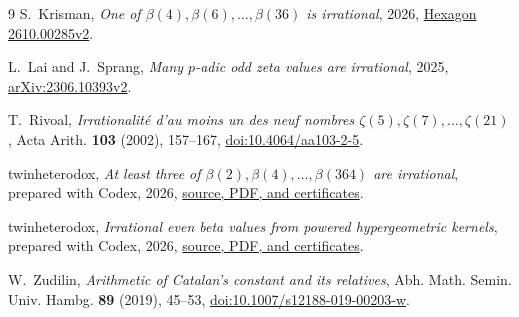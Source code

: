 \clearpage
\begin{thebibliography}{9}
S.~Krisman, \emph{One of $\beta(4),\beta(6),\ldots,\beta(36)$ is
irrational}, 2026, \href{https://hexagonmath.org/abs/2610.00285v2}{Hexagon 2610.00285v2}.

L.~Lai and J.~Sprang, \emph{Many $p$-adic odd zeta values are irrational},
2025, \href{https://arxiv.org/abs/2306.10393v2}{arXiv:2306.10393v2}.

T.~Rivoal, \emph{Irrationalit\'e d'au moins un des neuf nombres
$\zeta(5),\zeta(7),\ldots,\zeta(21)$},
Acta Arith. \textbf{103} (2002), 157--167,
\href{https://doi.org/10.4064/aa103-2-5}{doi:10.4064/aa103-2-5}.

twinheterodox, \emph{At least three of
$\beta(2),\beta(4),\ldots,\beta(364)$ are irrational},
prepared with Codex, 2026,
\href{https://github.com/twinheterodox/beta4/tree/94cf59dad9ebb2ff0ee666238a28abb14eca0466/finite-even-beta}{source, PDF, and certificates}.

twinheterodox, \emph{Irrational even beta values from powered
hypergeometric kernels}, prepared with Codex, 2026,
\href{https://github.com/twinheterodox/beta4/tree/94cf59dad9ebb2ff0ee666238a28abb14eca0466/powered-beta-kernels}{source, PDF, and certificates}.

W.~Zudilin, \emph{Arithmetic of Catalan's constant and its relatives},
Abh. Math. Semin. Univ. Hambg. \textbf{89} (2019), 45--53,
\href{https://doi.org/10.1007/s12188-019-00203-w}{doi:10.1007/s12188-019-00203-w}.
\end{thebibliography}
